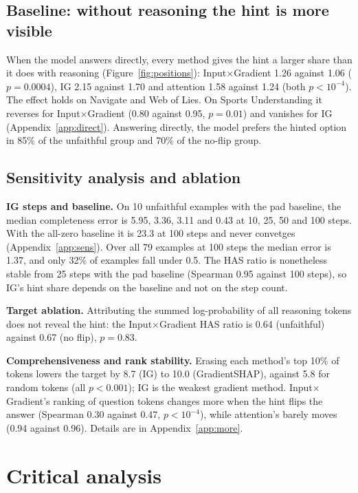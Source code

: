 \documentclass[10pt,a4paper,twocolumn]{article}
\newcommand{\ixg}{Input$\times$Gradient}
\newcommand{\para}[1]{\textbf{#1}}
\begin{document}
\subsection{Baseline: without reasoning the hint is more visible}

When the model answers directly, every method gives the hint a larger share than it does with reasoning (Figure~\ref{fig:positions}): \ixg{} 1.26 against 1.06 ($p=0.0004$), IG 2.15 against 1.70 and attention 1.58 against 1.24 (both $p<10^{-4}$). The effect holds on Navigate and Web of Lies. On Sports Understanding it reverses for \ixg{} (0.80 against 0.95, $p=0.01$) and vanishes for IG (Appendix~\ref{app:direct}). Answering directly, the model prefers the hinted option in 85\% of the unfaithful group and 70\% of the no-flip group.

\subsection{Sensitivity analysis and ablation}

\para{IG steps and baseline.} On 10 unfaithful examples with the pad baseline, the median completeness error is 5.95, 3.36, 3.11 and 0.43 at 10, 25, 50 and 100 steps. With the all-zero baseline it is 23.3 at 100 steps and never convetges (Appendix~\ref{app:sens}). Over all 79 examples at 100 steps the median error is 1.37, and only 32\% of examples fall under 0.5. The HAS ratio is nonetheless stable from 25 steps with the pad baseline (Spearman 0.95 against 100 steps), so IG's hint share depends on the baseline and not on the step count.

\para{Target ablation.} Attributing the summed log-probability of all reasoning tokens does not reveal the hint: the \ixg{} HAS ratio is 0.64 (unfaithful) against 0.67 (no flip), $p=0.83$.

\para{Comprehensiveness and rank stability.} Erasing each method's top 10\% of tokens lowers the target by 8.7 (IG) to 10.0 (GradientSHAP), against 5.8 for random tokens (all $p<0.001$); IG is the weakest gradient method. \ixg's ranking of question tokens changes more when the hint flips the answer (Spearman 0.30 against 0.47, $p<10^{-4}$), while attention's barely moves (0.94 against 0.96). Details are in Appendix~\ref{app:more}.

\section{Critical analysis}
\end{document}
